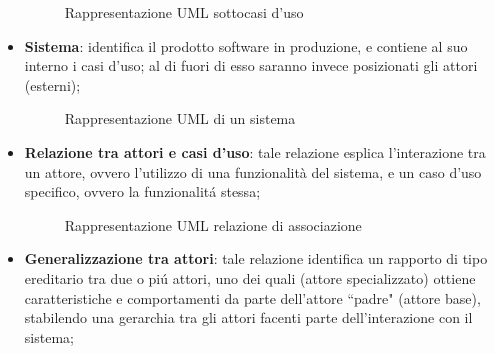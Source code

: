 \begin{itemize}
\begin{figure}[ht!]
            \caption{Rappresentazione UML sottocasi d'uso}
            \label{fig:Rappresentazione UML sottocasi d'uso}
        \end{figure}
    \item \textbf{Sistema}: identifica il prodotto software in produzione, e contiene al suo interno i casi d'uso; al di fuori di esso saranno invece posizionati gli attori (esterni);
        \begin{figure}[ht!]
            \centering
            \caption{Rappresentazione UML di un sistema}
            \label{fig:Rappresentazione UML di un sistema}
        \end{figure}
    \item \textbf{Relazione tra attori e casi d'uso}: tale relazione esplica l'interazione tra un attore, ovvero l'utilizzo di una funzionalità del sistema, e un caso d'uso specifico, ovvero la funzionalitá stessa;
        \begin{figure}[ht!]
            \centering
            \caption{Rappresentazione UML relazione di associazione}
            \label{fig:Rappresentazione UML relazione di associazione}
        \end{figure}
    \item \textbf{Generalizzazione tra attori}: tale relazione identifica un rapporto di tipo ereditario tra due o piú attori, uno dei quali (attore specializzato) ottiene caratteristiche e comportamenti da parte dell'attore ``padre" (attore base), stabilendo una gerarchia tra gli attori facenti parte dell'interazione con il sistema;

\end{itemize}
